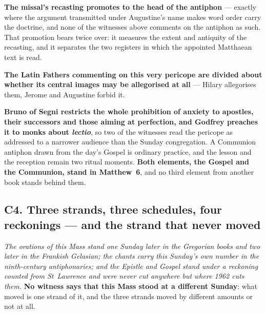 \textbf{The missal's recasting promotes  to the head of the
antiphon} --- exactly where the argument transmitted under Augustine's name
makes word order carry the doctrine, and none of the witnesses above comments
on the antiphon as such. That promotion bears twice over: it measures the extent and
antiquity of the recasting, and it separates the two registers in which the
appointed Matthaean text is read.

\textbf{The Latin Fathers commenting on this very pericope are divided about
whether its central images may be allegorised at all} --- Hilary allegorises
them, Jerome and Augustine forbid it.

\textbf{Bruno
of Segni restricts the whole prohibition of anxiety to apostles, their
successors and those aiming at perfection, and Godfrey preaches it to monks
about \emph{lectio}}, so two of the witnesses read the pericope as addressed to
a narrower audience than the Sunday congregation. A Communion antiphon drawn
from the day's Gospel is ordinary practice, and the lesson and the reception
remain two ritual moments.
\textbf{Both elements, the Gospel and the Communion, stand in Matthew~6}, and no
third element from another book stands behind them.

\subsection*{C4. Three strands, three schedules, four reckonings --- and the strand that never moved}

\emph{The orations of this Mass stand one Sunday later in the Gregorian books
and two later in the Frankish Gelasian; the chants carry this Sunday's own
number in the ninth-century antiphonaries; and the Epistle and Gospel stand
under a reckoning counted from St~Lawrence and were never cut anywhere but where
1962 cuts them.} \textbf{No witness says that this Mass stood at a different
Sunday}: what moved is one strand of it, and the three strands moved by
different amounts or not at all.

